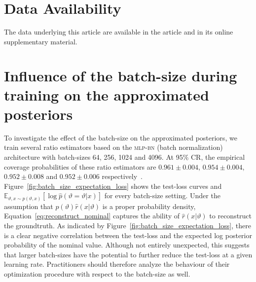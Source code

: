 \documentclass[fleqn,usenatbib]{mnras}
\begin{document}
\section*{Data Availability}
The data underlying this article are available in the article and in its online supplementary material.






\clearpage
\appendix
\section{Influence of the batch-size during training on the approximated posteriors}
\label{appendix:sec:batch_size}

To investigate the effect of the batch-size on the approximated posteriors,
we train several ratio estimators based on the \textsc{mlp-bn} (batch normalization) architecture with
batch-sizes 64, 256, 1024 and 4096. At 95\% CR, the
empirical coverage probabilities of these ratio estimators are $0.961\pm0.004$, $0.954\pm0.004$, $0.952\pm0.008$ and $0.952\pm0.006$ respectively~\protect{}.
Figure~\ref{fig:batch_size_expectation_loss} shows the test-loss curves and
$
\label{eq:reconstruct_nominal}
\mathbb{E}_{\vartheta,x\sim p(\vartheta,x)}\left[\log \hat{p}(\vartheta=\vartheta \vert x)\right]
$
for every batch-size setting. Under the assumption that $p(\vartheta)\hat{r}(x\vert\vartheta)$ is
a proper probability density, Equation~\ref{eq:reconstruct_nominal} captures the ability of $\hat{r}(x\vert\vartheta)$
to reconstruct the groundtruth. As indicated by Figure~\ref{fig:batch_size_expectation_loss},
there is a clear negative correlation between the test-loss and the expected log posterior
probability of the nominal value.
Although not entirely unexpected, this suggests that larger batch-sizes
have the potential to further reduce the test-loss at a given learning rate.
Practitioners should therefore analyze the behaviour of their optimization
procedure with respect to the batch-size as well.
\newline
\end{document}
